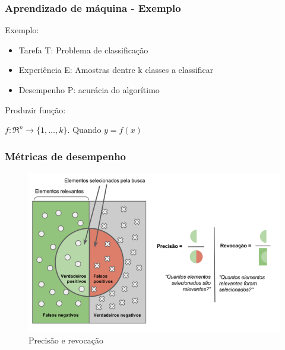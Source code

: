 \documentclass{beamer}
\begin{document}
\begin{frame}
    \frametitle{Aprendizado de máquina - Exemplo}
    Exemplo:  

    \begin{itemize}
        \item Tarefa T: Problema de classificação
        \item Experiência E: Amostras dentre k classes a classificar
        \item Desempenho P: acurácia do algorítimo
    \end{itemize}
    
    Produzir função:

    \(f:\Re^n\rightarrow \{1,\ldots,k\}\). Quando \( y=f(x) \)
    \end{frame}


\begin{frame}
        \frametitle{Métricas de desempenho}
        \begin{figure}[!ht]
            \centering
                \includegraphics[width=\columnwidth]{Imagens/Precisão_e_revocação_cropped.png}
            \caption{Precisão e revocação}         
        \end{figure}
\end{frame}  
\end{document}
